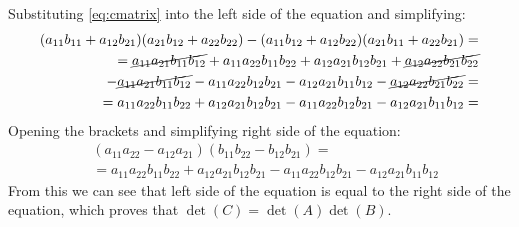 \documentclass[12pt]{article}
\begin{document}
Substituting \ref{eq:cmatrix} into the left side of the equation and simplifying:
\begin{equation}
    \begin{split}
        (a_{11}b_{11}+a_{12}b_{21})(a_{21}b_{12}+a_{22}b_{22}) - (a_{11}b_{12}+a_{12}b_{22})(a_{21}b_{11}+a_{22}b_{21}) =\\
        =\cancel{a_{11}a_{21}b_{11}b_{12}} + a_{11}a_{22}b_{11}b_{22} + a_{12}a_{21}b_{12}b_{21} + \cancel{a_{12}a_{22}b_{21}b_{22}} \\
        - \cancel{a_{11}a_{21}b_{11}b_{12}} - a_{11}a_{22}b_{12}b_{21} - a_{12}a_{21}b_{11}b_{12} - \cancel{a_{12}a_{22}b_{21}b_{22}} = \\
        = a_{11}a_{22}b_{11}b_{22} + a_{12}a_{21}b_{12}b_{21} - a_{11}a_{22}b_{12}b_{21} - a_{12}a_{21}b_{11}b_{12} = \\
    \end{split} 
\end{equation}
Opening the brackets and simplifying right side of the equation:
\begin{equation}
    \begin{split}
        &(a_{11}a_{22} - a_{12}a_{21})(b_{11}b_{22} - b_{12}b_{21}) = \\
        &=a_{11}a_{22}b_{11}b_{22} + a_{12}a_{21}b_{12}b_{21} - a_{11}a_{22}b_{12}b_{21} - a_{12}a_{21}b_{11}b_{12}  
    \end{split}
\end{equation}
From this we can see that left side of the equation is equal to the right side of the equation, which proves that $\det(C) = \det(A)\det(B)$.
\end{document}
